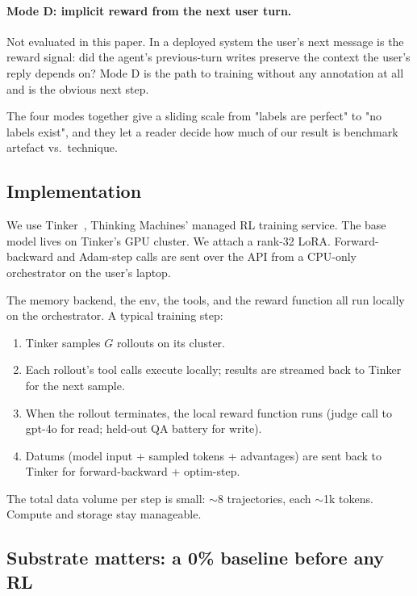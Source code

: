 \documentclass[11pt]{article}
\begin{document}
\paragraph{Mode D: implicit reward from the next user turn.} Not
evaluated in this paper. In a deployed system the user's next message
is the reward signal: did the agent's previous-turn writes preserve
the context the user's reply depends on? Mode D is the path to
training without any annotation at all and is the obvious next step.

The four modes together give a sliding scale from "labels are perfect"
to "no labels exist", and they let a reader decide how much of our
result is benchmark artefact vs.\ technique.

\subsection{Implementation}

We use Tinker~\cite{tinker2025}, Thinking Machines' managed RL training
service. The base model lives on Tinker's GPU cluster. We attach a
rank-32 LoRA. Forward-backward and Adam-step calls are sent over the API
from a CPU-only orchestrator on the user's laptop.

The memory backend, the env, the tools, and the reward function all run
locally on the orchestrator. A typical training step:
\begin{enumerate}
  \item Tinker samples $G$ rollouts on its cluster.
  \item Each rollout's tool calls execute locally; results are streamed
    back to Tinker for the next sample.
  \item When the rollout terminates, the local reward function runs
    (judge call to gpt-4o for read; held-out QA battery for write).
  \item Datums (model input + sampled tokens + advantages) are sent back
    to Tinker for forward-backward + optim-step.
\end{enumerate}

The total data volume per step is small: $\sim$8 trajectories, each
$\sim$1k tokens. Compute and storage stay manageable.

\subsection{Substrate matters: a 0\% baseline before any RL}
\label{sec:chunking}
\end{document}
